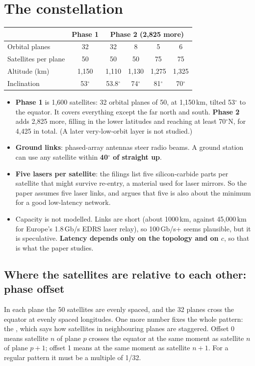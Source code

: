 \section{The constellation}

\begin{center}
\small
\begin{tabular}{@{}lccccc@{}}
\toprule
 & \textbf{Phase 1} & \multicolumn{4}{c}{\textbf{Phase 2 (2,825 more)}}\\
\midrule
Orbital planes & 32 & 32 & 8 & 5 & 6\\
Satellites per plane & 50 & 50 & 50 & 75 & 75\\
Altitude (km) & 1,150 & 1,110 & 1,130 & 1,275 & 1,325\\
Inclination & 53$^\circ$ & 53.8$^\circ$ & 74$^\circ$ & 81$^\circ$ & 70$^\circ$\\
\bottomrule
\end{tabular}
\end{center}

\begin{itemize}
  \item \textbf{Phase 1} is 1,600 satellites: 32 orbital planes of 50, at 1,150\,km, tilted 53$^\circ$ to the equator. It covers everything except the far north and south.
        \textbf{Phase 2} adds 2,825 more, filling in the lower latitudes and reaching at least 70$^\circ$N, for 4,425 in total. (A later very-low-orbit layer is not studied.)
  \item \textbf{Ground links}: phased-array antennas steer radio beams. A ground station can use any satellite within \textbf{40$^\circ$ of straight up}.
  \item \textbf{Five lasers per satellite}: the filings list five silicon-carbide parts per satellite that might survive re-entry, a material used for laser mirrors.
        So the paper assumes five laser links, and argues that five is also about the minimum for a good low-latency network.
  \item Capacity is not modelled. Links are short (about 1000\,km, against 45,000\,km for Europe's 1.8\,Gb/s EDRS laser relay), so 100\,Gb/s+ seems plausible, but it is
        speculative. \textbf{Latency depends only on the topology and on $c$}, so that is what the paper studies.
\end{itemize}

\subsection{Where the satellites are relative to each other: phase offset}
In each plane the 50 satellites are evenly spaced, and the 32 planes cross the equator at evenly spaced longitudes. One more number fixes the whole pattern:
the , which says how satellites in neighbouring planes are staggered. Offset 0 means satellite $n$ of plane $p$ crosses the equator at the same moment
as satellite $n$ of plane $p+1$; offset 1 means at the same moment as satellite $n+1$. For a regular pattern it must be a multiple of 1/32.

